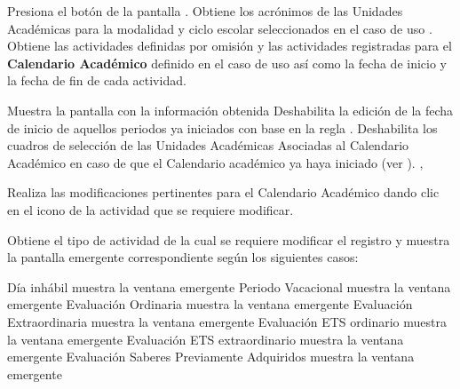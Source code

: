 
\begin{UCtrayectoria}
    \UCpaso[\UCactor] Presiona el botón  de la pantalla .
    \UCpaso Obtiene los acrónimos de las Unidades Académicas para la modalidad y ciclo escolar seleccionados en el caso de uso . 	
    \UCpaso Obtiene las actividades definidas por omisión y las actividades registradas para el \textbf{Calendario Académico} definido en el caso de uso  así como la fecha de inicio y la fecha de fin de cada actividad.
    

    \UCpaso Muestra la pantalla  con la información obtenida 
    \UCpaso Deshabilita la edición de la fecha de inicio de aquellos periodos ya iniciados con base en la regla .
    \UCpaso Deshabilita los cuadros de selección de las Unidades Académicas Asociadas al Calendario Académico en caso de que el Calendario académico ya haya iniciado (ver ). ,
    
    \UCpaso[\UCactor] \label{IN-DAE-CU2.2:actividad}Realiza las modificaciones pertinentes para el Calendario Académico dando clic en el icono \IURegistrar de la actividad que se requiere modificar.
    
    
    \UCpaso \label{IN-DAE-CU2.2:reg} Obtiene el tipo de actividad de la cual se requiere modificar el registro y muestra la pantalla emergente correspondiente según los siguientes casos:\\
    
    \begin{Titemize}
    	\Titem Día inhábil muestra la ventana emergente 
    \Titem Periodo Vacacional muestra la ventana emergente 
    \Titem Evaluación Ordinaria muestra la ventana emergente 
    \Titem Evaluación Extraordinaria muestra la ventana emergente 
    \Titem Evaluación ETS ordinario muestra la ventana emergente 
    \Titem Evaluación ETS extraordinario muestra la ventana emergente 
    \Titem Evaluación Saberes Previamente Adquiridos muestra la ventana emergente 
    	
    \end{Titemize}    



\end{UCtrayectoria}
